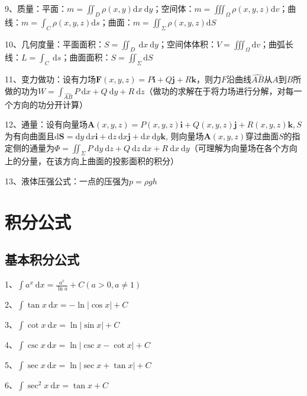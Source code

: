 9、质量：平面：$ m=\iint_{D} \rho(x, y) \mathrm{d} x \mathrm{~d} y $；空间体：$ m=\iiint_{\Omega} \rho(x, y, z) \mathrm{d} v $；曲线：$ m=\int_{C} \rho(x, y, z) \mathrm{d} s $；曲面：$ m=\iint_{\Sigma} \rho(x, y, z) \mathrm{d} S $

10、几何度量：平面面积：$ S=\iint_{D} \mathrm{~d} x \mathrm{~d} y $；空间体体积：$ V=\iiint_{\Omega} \mathrm{d} v $；曲弧长线：$ L=\int_{C} \mathrm{~d} s $；曲面面积：$ S=\iint_{\Sigma} \mathrm{d} S $

11、变力做功：设有力场$ \boldsymbol{F}(x, y, z)=P \boldsymbol{i}+Q \boldsymbol{j}+R \boldsymbol{k} $，则力$ F $沿曲线$ \widehat{A B} $从$ A $到$ B $所做的功为$ W=\int_{\widehat{A B}} P \mathrm{~d} x+Q \mathrm{~d} y+R \mathrm{~d} z $（做功的求解在于将力场进行分解，对每一个方向的功分开计算）

12、通量：设有向量场$ \boldsymbol{A}(x, y, z)=P(x, y, z) \boldsymbol{i}+Q(x, y, z) \boldsymbol{j}+R(x, y, z) \boldsymbol{k}, S $为有向曲面且$ \mathrm{d} \boldsymbol{S}=\mathrm{d} y \mathrm{~d} x \boldsymbol{i}+\mathrm{d} z \mathrm{~d} x \boldsymbol{j}+\mathrm{d} x \mathrm{~d} y \boldsymbol{k} $, 则向量场$ \boldsymbol{A}(x, y, z) $穿过曲面$ S $的指定侧的通量为$ \Phi=\iint_{\Sigma} P \mathrm{~d} y \mathrm{~d} z+Q \mathrm{~d} z \mathrm{~d} x+R \mathrm{~d} x \mathrm{~d} y $（可理解为向量场在各个方向上的分量，在该方向上曲面的投影面积的积分）

13、液体压强公式：一点的压强为$ p=\rho gh $

\section{积分公式}



\subsection{基本积分公式}

1、$ \int a^{x} \mathrm{~d} x=\frac{a^{x}}{\ln a}+C(a>0, a \neq 1) $

2、$ \int \tan x \mathrm{~d} x=-\ln |\cos x|+C $

3、$ \int \cot x \mathrm{~d} x=\ln |\sin x|+C $

4、$ \int \csc x \mathrm{~d} x=\ln |\csc x-\cot x|+C $

5、$ \int \sec x \mathrm{~d} x=\ln |\sec x+\tan x|+C $

6、$ \int \sec ^{2} x \mathrm{~d} x=\tan x+C $

